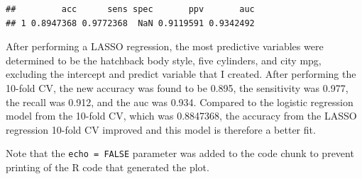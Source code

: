 \documentclass[]{article}
\begin{document}
\begin{verbatim}
##         acc      sens spec       ppv       auc
## 1 0.8947368 0.9772368  NaN 0.9119591 0.9342492
\end{verbatim}

After performing a LASSO regression, the most predictive variables were
determined to be the hatchback body style, five cylinders, and city mpg,
excluding the intercept and predict variable that I created. After
performing the 10-fold CV, the new accuracy was found to be 0.895, the
sensitivity was 0.977, the recall was 0.912, and the auc was 0.934.
Compared to the logistic regression model from the 10-fold CV, which was
0.8847368, the accuracy from the LASSO regression 10-fold CV improved
and this model is therefore a better fit.

Note that the \texttt{echo\ =\ FALSE} parameter was added to the code
chunk to prevent printing of the R code that generated the plot.
\end{document}

